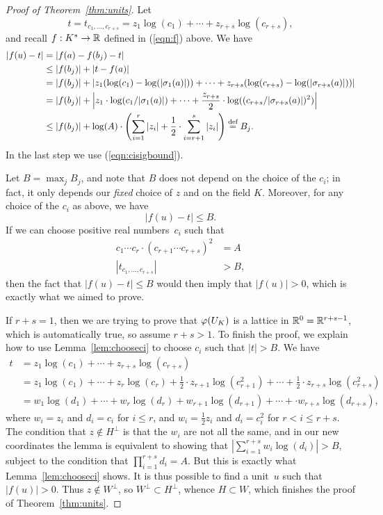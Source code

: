 \begin{proof}[Proof of Theorem~\ref{thm:units}]
	Let
	$$
		t = t_{c_1,\ldots, c_{r+s}} = z_1\log(c_1)+\cdots +z_{r+s}\log(c_{r+s}),
	$$
	and recall $f:K^*\to \mathbb{R}$ defined in (\ref{eqn:f}) above. We have
	\begin{align*}
		|f(u) - t| &= |f(a) - f(b_j) - t| \\
		&\leq |f(b_j)| + |t - f(a)| \\
		&=|f(b_j)| + \left|z_1(\log(c_1) - \log(|\sigma_1(a)|)) + \cdots + z_{r+s}(\log(c_{r+s}) - \log(|\sigma_{r+s}(a)|))\right| \\
		&=|f(b_j)| + \left|z_1\cdot \log(c_1/|\sigma_1(a)|) + \cdots + \frac{z_{r+s}}{2}\cdot \log((c_{r+s}/|\sigma_{r+s}(a)|)^2)\right| \\
		&\leq |f(b_j)| + \log(A)\cdot\left(\sum_{i=1}^{r}|z_i| + \frac{1}{2}\cdot \sum_{i=r+1}^s|z_i|\right)
		\defeq B_j.
	\end{align*}
	In the last step we use (\ref{eqn:cisigbound}).
	
	Let $B=\max_{j} B_j$, and note that $B$ does not depend on the choice
	of the $c_i$; in fact, it only depends our {\em fixed} choice of $z$ and
	on the field $K$. Moreover, for any choice of the $c_i$ as above, we have
	$$
		|f(u) - t| \leq B.
	$$
	If we can choose positive real numbers~$c_i$ such that
	\begin{align*}
		c_1\cdots c_r\cdot (c_{r+1}\cdots c_{r+s})^2 &= A \\
		|t_{c_1,\ldots, c_{r+s}}| &>B,
	\end{align*}
	then the fact that $|f(u)-t|\leq B$ would then imply that $|f(u)|>0$,
	which is exactly what we aimed to prove.
	
	If $r+s=1$, then we are trying to prove that $\varphi(U_K)$ is a lattice
	in $\mathbb{R}^0=\mathbb{R}^{r+s-1}$, which is automatically true, so assume $r+s>1$.
	To finish the proof, we explain how to use Lemma~\ref{lem:chooseci}
	to choose $c_i$ such that $|t|>B$. We have
	\begin{align*}
		t
		&= z_1\log(c_1)+\cdots +z_{r+s}\log(c_{r+s}) \\
		&= z_1\log(c_1)+\cdots +  z_r\log(c_r)
		+ \frac{1}{2}\cdot z_{r+1}\log(c_{r+1}^2) + \cdots
		+ \frac{1}{2}\cdot z_{r+s}\log(c_{r+s}^2) \\
		&= w_1\log(d_1)+\cdots +  w_r\log(d_r)+ w_{r+1}\log(d_{r+1}) +
		\cdots +\cdot w_{r+s}\log(d_{r+s}),
	\end{align*}
	where $w_i=z_i$ and $d_i=c_i$ for $i\leq r$, and
	$w_i=\frac{1}{2}z_i$ and $d_i=c_i^2$ for $r<i\leq r+s$.
	The condition that $z\not\in H^{\perp}$ is that the $w_i$ are not all
	the same, and in our new coordinates the lemma is equivalent to
	showing that $|\sum_{i=1}^{r+s} w_i \log(d_i)|>B$, subject to the
	condition that $\prod_{i=1}^{r+s} d_i = A$.
	But this is exactly what Lemma~\ref{lem:chooseci} shows. It is thus possible
	to find a unit~$u$ such that $|f(u)|>0$. Thus $z\not\in W^{\perp}$,
	so $W^{\perp}\subset H^{\perp}$, whence $H\subset W$,
	which finishes the proof of Theorem~\ref{thm:units}.
\end{proof}

